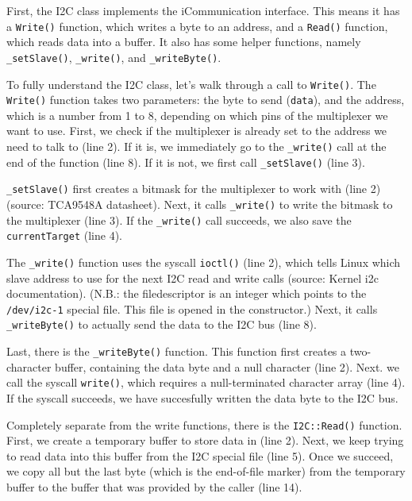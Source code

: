 \documentclass[a4paper,oneside]{book}
\begin{document}
First, the I2C class implements the iCommunication interface. This means it has
a \lstinline|Write()| function, which writes a byte to an address, and a \lstinline|Read()| function,
which reads data into a buffer. It also has some helper functions, namely
\lstinline|_setSlave()|, \lstinline|_write()|, and \lstinline|_writeByte()|.



To fully understand the I2C class, let's walk through a call to
\lstinline|Write()|. The \lstinline|Write()| function takes two parameters: the
byte to send (\lstinline|data|), and the address, which is a number from 1 to
8, depending on which pins of the multiplexer we want to use. First, we check
if the multiplexer is already set to the address we need to talk to (line 2).
If it is, we immediately go to the \lstinline|_write()| call at the end of the
function (line 8). If it is not, we first call \lstinline|_setSlave()| (line
3).



\lstinline|_setSlave()| first creates a bitmask for the multiplexer to work
with (line 2) (source: TCA9548A datasheet). Next, it calls \lstinline|_write()|
to write the bitmask to the multiplexer (line 3). If the \lstinline|_write()|
call succeeds, we also save the \lstinline|currentTarget| (line 4).



The \lstinline|_write()| function uses the syscall \lstinline|ioctl()| (line
2), which tells Linux which slave address to use for the next I2C read and
write calls (source: Kernel i2c documentation). (N.B.: the filedescriptor is an
integer which points to the \lstinline|/dev/i2c-1| special file. This file is
opened in the constructor.) Next, it calls \lstinline|_writeByte()| to actually
send the data to the I2C bus (line 8).



Last, there is the \lstinline|_writeByte()| function. This function first
creates a two-character buffer, containing the data byte and a null character
(line 2).  Next. we call the syscall \lstinline|write()|, which requires a
null-terminated character array (line 4). If the syscall succeeds, we have
succesfully written the data byte to the I2C bus.



Completely separate from the write functions, there is the
\lstinline|I2C::Read()| function. First, we create a temporary buffer to store
data in (line 2). Next, we keep trying to read data into this buffer from the
I2C special file (line 5). Once we succeed, we copy all but the last byte
(which is the end-of-file marker) from the temporary buffer to the buffer that
was provided by the caller (line 14).
\end{document}

